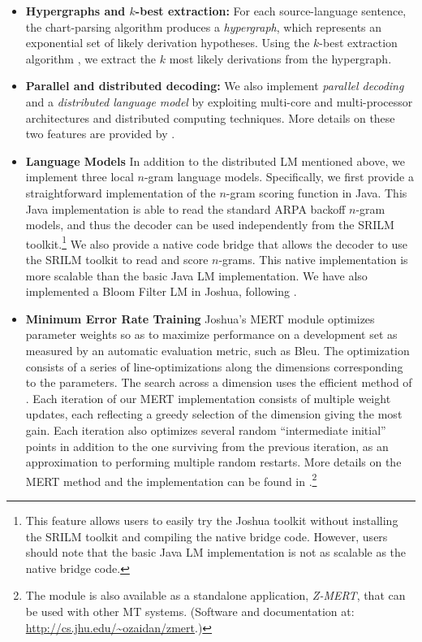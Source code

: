 \documentclass[11pt]{article}
\begin{document}
\begin{itemize}
\item \textbf{Hypergraphs and $k$-best extraction:}
For each source-language sentence, the chart-parsing algorithm produces a \emph{hypergraph}, which represents an exponential set of likely derivation hypotheses. Using the $k$-best extraction algorithm \cite{Huang2005}, we extract the $k$ most likely derivations from the hypergraph.

\item \textbf{Parallel and distributed decoding:}
We also implement \emph{parallel decoding} and a \emph{distributed language model} by exploiting multi-core and multi-processor architectures and distributed computing techniques. More details on these two features are provided by .

\item \textbf{Language Models}
In addition to the distributed LM mentioned above, we implement three local $n$-gram language models. Specifically, we first provide a straightforward implementation of the $n$-gram scoring function in Java. This Java implementation is able to read the standard ARPA backoff $n$-gram models, and thus the decoder can be used independently from the SRILM toolkit.\footnote{This feature allows users to easily try the Joshua toolkit without installing the SRILM toolkit and compiling the native bridge code. However, users should note that the basic Java LM implementation is not as scalable as the native bridge code.} We also provide a native code bridge that allows the decoder to use the SRILM toolkit to read and score $n$-grams. This native implementation is more scalable than the basic Java LM implementation. We have also implemented a Bloom Filter LM in Joshua, following .

\item \textbf{Minimum Error Rate Training}
Joshua's MERT module optimizes parameter weights so as to maximize performance on a development set as measured by an automatic evaluation metric, such as Bleu. The optimization consists of a series of line-optimizations along the dimensions corresponding to the parameters. The search across a dimension uses the efficient method of . Each iteration of our MERT implementation consists of multiple weight updates, each reflecting a greedy selection of the dimension giving the most gain. Each iteration also optimizes several random ``intermediate initial'' points in addition to the one surviving from the previous iteration, as an approximation to performing multiple random restarts. More details on the MERT method and the implementation can be found in .\footnote{The module is also available as a standalone application, {\em Z-MERT}, that can be used with other MT systems. (Software and documentation at: \url{http://cs.jhu.edu/~ozaidan/zmert}.)}




\end{itemize}
\end{document}
